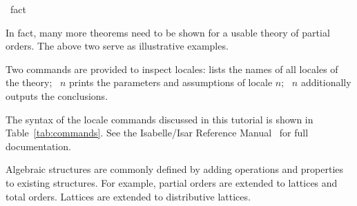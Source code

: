 \begin{isabellebody}
\ fact\isanewline
\ \ \ \ \isamarkupfalse%
\isanewline
\ \ \isamarkupfalse%
%
\endisataginvisible
{\isafoldinvisible}%
%
\isadeliminvisible
\isanewline
%
\endisadeliminvisible
\isanewline
\ \ \isamarkupfalse%
%
\begin{isamarkuptext}%
In fact, many more theorems need to be shown for a usable
  theory of partial orders.  The
  above two serve as illustrative examples.%
\end{isamarkuptext}%
\isamarkuptrue%
%
\begin{isamarkuptext}%
Two commands are provided to inspect locales:
   lists the names of all locales of the
  theory; ~$n$ prints the parameters and
  assumptions of locale $n$; ~$n$
  additionally outputs the conclusions.

  The syntax of the locale commands discussed in this tutorial is
  shown in Table~\ref{tab:commands}.  See the
  Isabelle/Isar Reference Manual~\cite{IsarRef}
  for full documentation.%
\end{isamarkuptext}%
\isamarkuptrue%
%
\isamarkuptrue%
%
\begin{isamarkuptext}%
\label{sec:import}

  Algebraic structures are commonly defined by adding operations and
  properties to existing structures.  For example, partial orders
  are extended to lattices and total orders.  Lattices are extended to
  distributive lattices.


\end{isamarkuptext}
\end{isabellebody}
